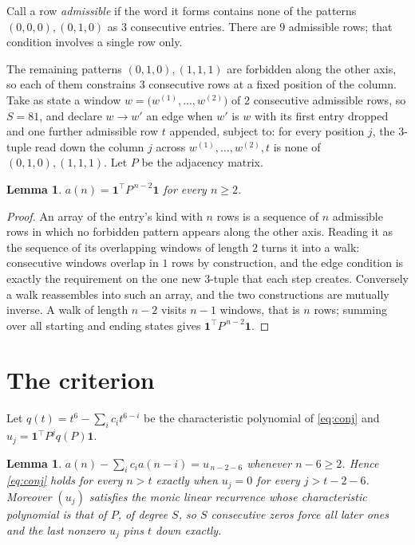 \documentclass[11pt,a4paper]{article}
\theoremstyle{plain}
\newtheorem{lemma}[theorem]{Lemma}
\theoremstyle{definition}
\begin{document}
Call a row \emph{admissible} if the word it forms contains none of the patterns
$(0,0,0), (0,1,0)$ as $3$ consecutive entries. There are $9$ admissible rows; that condition
involves a single row only.

The remaining patterns $(0,1,0), (1,1,1)$ are forbidden along the other axis, so each of them
constrains $3$ consecutive rows at a fixed position of the column. Take as state a
window $w=\bigl(w^{(1)},\dots,w^{(2)}\bigr)$ of $2$ consecutive admissible
rows, so $S=81$, and declare $w\to w'$ an edge when $w'$ is $w$ with its first entry
dropped and one further admissible row $t$ appended, subject to: for every position
$j$, the $3$-tuple read down the column $j$ across $w^{(1)},\dots,w^{(2)},t$
is none of $(0,1,0), (1,1,1)$. Let $P$ be the adjacency matrix.

\begin{lemma}\label{lem:walk}
$a(n)=\mathbf{1}^{\!\top}P^{\,n-2}\mathbf{1}$ for every $n\ge2$.
\end{lemma}

\begin{proof}
An array of the entry's kind with $n$ rows is a sequence of $n$ admissible rows in
which no forbidden pattern appears along the other axis. Reading it as the sequence of its
overlapping windows of length $2$ turns it into a walk: consecutive windows overlap in
$1$ rows by construction, and the edge condition is exactly the requirement on the one
new $3$-tuple that each step creates. Conversely a walk reassembles into such an array,
and the two constructions are mutually inverse. A walk of length $n-2$ visits $n-1$
windows, that is $n$ rows; summing over all starting and ending states gives
$\mathbf{1}^{\!\top}P^{\,n-2}\mathbf{1}$.
\end{proof}

\section{The criterion}

Let $q(t)=t^{6}-\sum_i c_i t^{6-i}$ be the characteristic polynomial of
\eqref{eq:conj} and $u_j=\mathbf{1}^{\!\top}P^{j}q(P)\mathbf{1}$.

\begin{lemma}\label{lem:crit}
$a(n)-\sum_i c_i a(n-i)=u_{\,n-2-6}$ whenever $n-6\ge2$. Hence
\eqref{eq:conj} holds for every $n>t$ exactly when $u_j=0$ for every
$j>t-2-6$. Moreover $(u_j)$ satisfies the monic linear recurrence whose
characteristic polynomial is that of $P$, of degree $S$, so $S$ consecutive zeros force all
later ones and the last nonzero $u_j$ pins $t$ down exactly.
\end{lemma}
\end{document}
